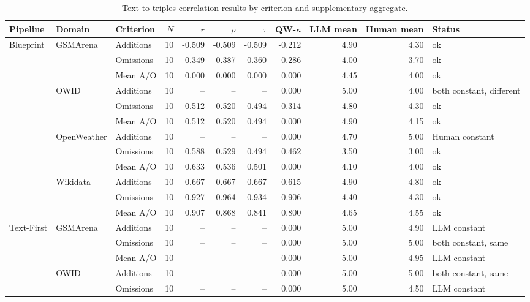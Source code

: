 \begin{table}[!htbp]
\centering
\caption{Text-to-triples correlation results by criterion and supplementary aggregate.}
\label{tab:judge-human-triples-correlation}
\begin{tabular}{lllrrrrrrr>{\raggedright\arraybackslash}p{42pt}}
\hline
\textbf{Pipeline} & \textbf{Domain} & \textbf{Criterion} & \textbf{$N$} & \textbf{$r$} & \textbf{$\rho$} & \textbf{$\tau$} & \textbf{QW-$\kappa$} & \textbf{LLM mean} & \textbf{Human mean} & \textbf{Status} \\
\hline
Blueprint & GSMArena & Additions & 10 & -0.509 & -0.509 & -0.509 & -0.212 & 4.90 & 4.30 & ok \\
 &  & Omissions & 10 & 0.349 & 0.387 & 0.360 & 0.286 & 4.00 & 3.70 & ok \\
 &  & Mean A/O & 10 & 0.000 & 0.000 & 0.000 & 0.000 & 4.45 & 4.00 & ok \\
 & OWID & Additions & 10 & -- & -- & -- & 0.000 & 5.00 & 4.00 & both constant, different \\
 &  & Omissions & 10 & 0.512 & 0.520 & 0.494 & 0.314 & 4.80 & 4.30 & ok \\
 &  & Mean A/O & 10 & 0.512 & 0.520 & 0.494 & 0.000 & 4.90 & 4.15 & ok \\
 & OpenWeather & Additions & 10 & -- & -- & -- & 0.000 & 4.70 & 5.00 & Human constant \\
 &  & Omissions & 10 & 0.588 & 0.529 & 0.494 & 0.462 & 3.50 & 3.00 & ok \\
 &  & Mean A/O & 10 & 0.633 & 0.536 & 0.501 & 0.000 & 4.10 & 4.00 & ok \\
 & Wikidata & Additions & 10 & 0.667 & 0.667 & 0.667 & 0.615 & 4.90 & 4.80 & ok \\
 &  & Omissions & 10 & 0.927 & 0.964 & 0.934 & 0.906 & 4.40 & 4.30 & ok \\
 &  & Mean A/O & 10 & 0.907 & 0.868 & 0.841 & 0.800 & 4.65 & 4.55 & ok \\
\hline
Text-First & GSMArena & Additions & 10 & -- & -- & -- & 0.000 & 5.00 & 4.90 & LLM constant \\
 &  & Omissions & 10 & -- & -- & -- & 0.000 & 5.00 & 5.00 & both constant, same \\
 &  & Mean A/O & 10 & -- & -- & -- & 0.000 & 5.00 & 4.95 & LLM constant \\
 & OWID & Additions & 10 & -- & -- & -- & 0.000 & 5.00 & 5.00 & both constant, same \\
 &  & Omissions & 10 & -- & -- & -- & 0.000 & 5.00 & 4.50 & LLM constant \\

\end{tabular}
\end{table}

